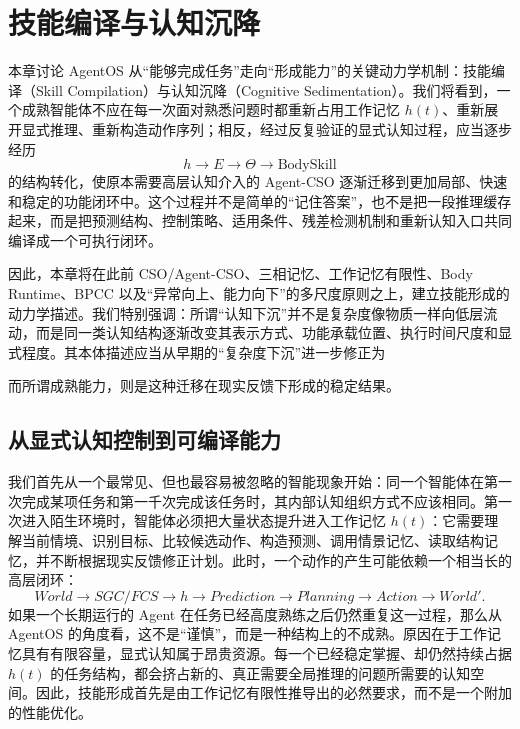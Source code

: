 \chapter{技能编译与认知沉降}
\label{chap:skill-compilation}

\begin{chapterlead}
本章讨论 AgentOS 从“能够完成任务”走向“形成能力”的关键动力学机制：技能编译（Skill Compilation）与认知沉降（Cognitive Sedimentation）。我们将看到，一个成熟智能体不应在每一次面对熟悉问题时都重新占用工作记忆 $h(t)$、重新展开显式推理、重新构造动作序列；相反，经过反复验证的显式认知过程，应当逐步经历
\[
h
\rightarrow
E
\rightarrow
\Theta
\rightarrow
\mathrm{BodySkill}
\]
的结构转化，使原本需要高层认知介入的 Agent-CSO 逐渐迁移到更加局部、快速和稳定的功能闭环中。这个过程并不是简单的“记住答案”，也不是把一段推理缓存起来，而是把预测结构、控制策略、适用条件、残差检测机制和重新认知入口共同编译成一个可执行闭环。

因此，本章将在此前 CSO/Agent-CSO、三相记忆、工作记忆有限性、Body Runtime、BPCC 以及“异常向上、能力向下”的多尺度原则之上，建立技能形成的动力学描述。我们特别强调：所谓“认知下沉”并不是复杂度像物质一样向低层流动，而是同一类认知结构逐渐改变其表示方式、功能承载位置、执行时间尺度和显式程度。其本体描述应当从早期的“复杂度下沉”进一步修正为
\begin{statementbox}
\centering
{}
\end{statementbox}
而所谓成熟能力，则是这种迁移在现实反馈下形成的稳定结果。
\end{chapterlead}

\section{从显式认知控制到可编译能力}

我们首先从一个最常见、但也最容易被忽略的智能现象开始：同一个智能体在第一次完成某项任务和第一千次完成该任务时，其内部认知组织方式不应该相同。第一次进入陌生环境时，智能体必须把大量状态提升进入工作记忆 $h(t)$：它需要理解当前情境、识别目标、比较候选动作、构造预测、调用情景记忆、读取结构记忆，并不断根据现实反馈修正计划。此时，一个动作的产生可能依赖一个相当长的高层闭环：
\[
World
\rightarrow
SGC/FCS
\rightarrow
h
\rightarrow
Prediction
\rightarrow
Planning
\rightarrow
Action
\rightarrow
World'.
\]
如果一个长期运行的 Agent 在任务已经高度熟练之后仍然重复这一过程，那么从 AgentOS 的角度看，这不是“谨慎”，而是一种结构上的不成熟。原因在于工作记忆具有有限容量，显式认知属于昂贵资源。每一个已经稳定掌握、却仍然持续占据 $h(t)$ 的任务结构，都会挤占新的、真正需要全局推理的问题所需要的认知空间。因此，技能形成首先是由工作记忆有限性推导出的必然要求，而不是一个附加的性能优化。

